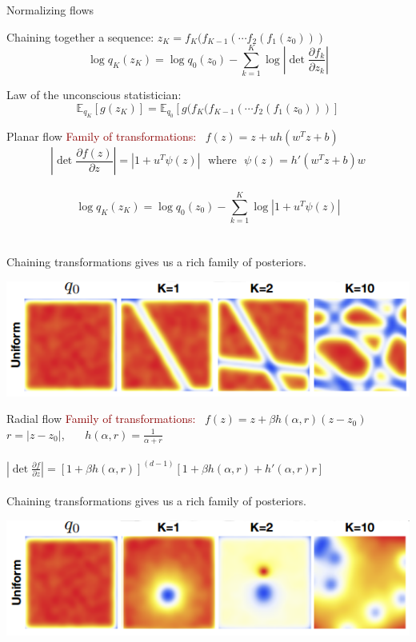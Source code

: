 \documentclass[unicode,11pt]{beamer}
\begin{document}
\begin{frame}[fragile]{Normalizing flows}
  
  Chaining together a sequence: $z_K = f_K ( f_{K−1} ( \cdots f_2 ( f_1(z_0)))$\\
  $$\log q_K(z_K) = \log q_0(z_0) − \sum_{k=1}^K \log \left\vert \det \frac{\partial f_k}{\partial z_k} \right\vert $$

  Law of the unconscious statistician:\\
  $$\mathbb{E}_{q_K} \left[g(z_K)\right] = \mathbb{E}_{q_0} \left[ g(f_K ( f_{K−1} ( \cdots f_2 ( f_1(z_0))) \right] $$
\end{frame}


\begin{frame}[fragile]{Planar flow}
  \textcolor{darkred}{Family of transformations:} ~$f(z) = z + uh\left( w^T z + b \right)$\\ 
  $$ \left\vert \det \frac{\partial f(z)}{\partial z} \right\vert = \left\vert 1 + u^T \psi(z)
  \right\vert ~~~\text{where}~~~ \psi(z) = h'(w^Tz + b)w$$ \\
  $$\log q_K(z_K) = \log q_0(z_0) − \sum_{k=1}^K \log \left\vert 1 + u^T \psi(z) \right\vert $$\\
  ~\\
  Chaining transformations gives us a rich family of posteriors.
  \begin{center}
    \includegraphics[width=.8\textwidth]{images/planar_flow}
  \end{center}
\end{frame}


\begin{frame}[fragile]{Radial flow}
  \textcolor{darkred}{Family of transformations:} ~$f(z) = z + \beta h(\alpha, r)(z-z_0)$\\
  \hspace{12em}$r = \vert z-z_0 \vert$,~~~ $h(\alpha, r) = \frac{1}{\alpha + r}$\\
  ~\\
  $\left\vert \det \frac{\partial f}{\partial z} \right\vert = [1 + \beta h(\alpha, r)]^{(d-1)}
  [1 + \beta h(\alpha, r) + h'(\alpha, r) r]$\\
  ~\\
  Chaining transformations gives us a rich family of posteriors.
  \begin{center}
    \includegraphics[width=.8\textwidth]{images/radial_flow}
  \end{center}
\end{frame}
\end{document}
